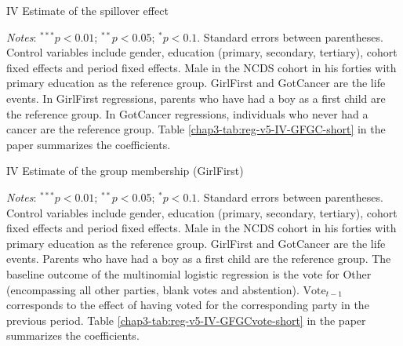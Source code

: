 \begin{table}[!htb]
    \centering
    \caption{IV Estimate of the spillover effect}
    \label{chap3-tab:reg-v5-IV-GFGC-long}
    \begin{threeparttable}
        
        \begin{tablenotes}[flushleft]
            \footnotesize{\item \textit{Notes}: $^{***}p<0.01$; $^{**}p<0.05$; $^{*}p<0.1$. Standard errors between parentheses. Control variables include gender, education (primary, secondary, tertiary), cohort fixed effects and period fixed effects. Male in the NCDS cohort in his forties with primary education as the reference group. GirlFirst and GotCancer are the life events. In GirlFirst regressions, parents who have had a boy as a first child are the reference group. In GotCancer regressions, individuals who never had a cancer are the reference group. Table \ref{chap3-tab:reg-v5-IV-GFGC-short} in the paper summarizes the coefficients.}
        \end{tablenotes}
    \end{threeparttable}
\end{table}

\begin{table}[!htb]
    \centering
    \caption{IV Estimate of the group membership (GirlFirst)}
    \label{chap3-tab:reg-v5-IV-GFvote}
    \begin{threeparttable}
        \setlength{\tabcolsep}{3pt}
        
        \begin{tablenotes}[flushleft]
            \footnotesize{\item \textit{Notes}: $^{***}p<0.01$; $^{**}p<0.05$; $^{*}p<0.1$. Standard errors between parentheses. Control variables include gender, education (primary, secondary, tertiary), cohort fixed effects and period fixed effects. Male in the NCDS cohort in his forties with primary education as the reference group. GirlFirst and GotCancer are the life events. Parents who have had a boy as a first child are the reference group.
            The baseline outcome of the multinomial logistic regression is the vote for Other (encompassing all other parties, blank votes and abstention). $\text{Vote}_{t-1}$ corresponds to the effect of having voted for the corresponding party in the previous period.
            Table \ref{chap3-tab:reg-v5-IV-GFGCvote-short} in the paper summarizes the coefficients.}
        \end{tablenotes}
    \end{threeparttable}
\end{table}


